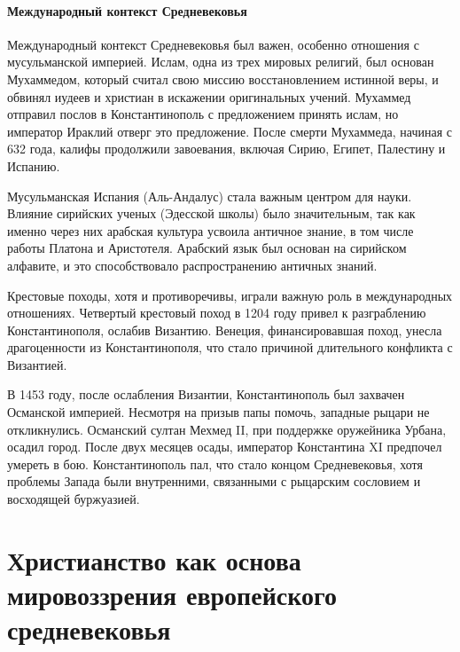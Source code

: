 \paragraph{Международный контекст Средневековья}

Международный контекст Средневековья был важен, особенно отношения с мусульманской империей. Ислам, одна из трех мировых религий, был основан Мухаммедом, который считал свою миссию восстановлением истинной веры, и обвинял иудеев и христиан в искажении оригинальных учений. Мухаммед отправил послов в Константинополь с предложением принять ислам, но император Ираклий отверг это предложение. После смерти Мухаммеда, начиная с 632 года, калифы продолжили завоевания, включая Сирию, Египет, Палестину и Испанию.

Мусульманская Испания (Аль-Андалус) стала важным центром для науки. Влияние сирийских ученых (Эдесской школы) было значительным, так как именно через них арабская культура усвоила античное знание, в том числе работы Платона и Аристотеля. Арабский язык был основан на сирийском алфавите, и это способствовало распространению античных знаний.

Крестовые походы, хотя и противоречивы, играли важную роль в международных отношениях. Четвертый крестовый поход в 1204 году привел к разграблению Константинополя, ослабив Византию. Венеция, финансировавшая поход, унесла драгоценности из Константинополя, что стало причиной длительного конфликта с Византией.

В 1453 году, после ослабления Византии, Константинополь был захвачен Османской империей. Несмотря на призыв папы помочь, западные рыцари не откликнулись. Османский султан Мехмед II, при поддержке оружейника Урбана, осадил город. После двух месяцев осады, император Константина XI предпочел умереть в бою. Константинополь пал, что стало концом Средневековья, хотя проблемы Запада были внутренними, связанными с рыцарским сословием и восходящей буржуазией.

\section{Христианство как основа мировоззрения европейского средневековья}


